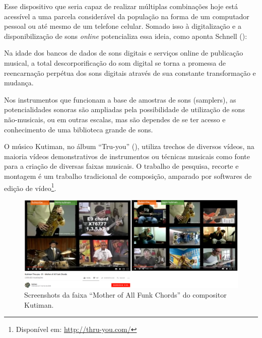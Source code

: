 Esse dispositivo que seria capaz de realizar múltiplas combinações hoje está acessível a uma parcela considerável da população na forma de um computador pessoal ou até mesmo de um telefone celular. Somado isso à digitalização e a disponibilização de sons \emph{online} potencializa essa ideia, como aponta Schnell (\citeyear{Schnell2013}):

\begin{citacao}
Na idade dos bancos de dados de sons digitais e serviços online de publicação musical, a total descorporificação do som digital se torna a promessa de reencarnação perpétua dos sons digitais através de sua constante transformação e mudança.\cite{Schnell2013}

\end{citacao}

Nos instrumentos que funcionam a base de amostras de sons (samplers), as potencialidades sonoras são ampliadas pela possibilidade de utilização de sons não-musicais, ou em outras escalas, mas são dependes de se ter acesso e conhecimento de uma biblioteca grande de sons. 

O músico Kutiman, no álbum ``Tru-you'' (\citeyear{Kutiman2010}), utiliza trechos de diversos vídeos, na maioria vídeos demonstrativos de instrumentos ou técnicas musicais como fonte para a criação de diversas faixas musicais. O trabalho de pesquisa, recorte e montagem é um trabalho tradicional de composição, amparado por softwares de edição de vídeo\footnote{Disponível em: \url{http://thru-you.com/}}. 


\begin{figure}
\includegraphics[width=1\textwidth]{pictures/cap4/kutiman}
\caption{Screenshots da faixa ``Mother of All Funk Chords'' do compositor Kutiman. }
\label{Kutiman}
\end{figure}


